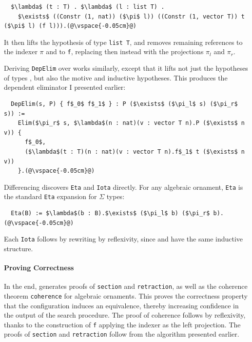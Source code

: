 \begin{lstlisting}
  $\lambda$ (t : T) . $\lambda$ (l : list T) .
    $\exists$ ((Constr (1, nat)) ($\pi$ l)) ((Constr (1, vector T)) t ($\pi$ l) (f l))).(@\vspace{-0.05cm}@)
\end{lstlisting}
It then lifts the hypothesis of type \lstinline{list T}, and removes remaining references to the indexer $\pi$ and to \lstinline{f},
replacing then instead with the projections $\pi_l$ and $\pi_r$.

Deriving \lstinline{DepElim} over \B works similarly, except that it lifts not just the hypotheses of types \Aa, but 
also the motive and inductive hypotheses.
This produces the dependent eliminator I presented earlier:

\begin{lstlisting}
  DepElim(s, P) { f$_0$ f$_1$ } : P ($\exists$ ($\pi_l$ s) ($\pi_r$ s)) :=
    Elim($\pi_r$ s, $\lambda$(n : nat)(v : vector T n).P ($\exists$ n v)) {
      f$_0$,
      ($\lambda$(t : T)(n : nat)(v : vector T n).f$_1$ t ($\exists$ n v))
    }.(@\vspace{-0.05cm}@) 
\end{lstlisting}

Differencing discovers \lstinline{Eta} and \lstinline{Iota} directly.
For any algebraic ornament, \lstinline{Eta} is the standard \lstinline{Eta} expansion for $\Sigma$ types:

\begin{lstlisting}
  Eta(B) := $\lambda$(b : B).$\exists$ ($\pi_l$ b) ($\pi_r$ b).(@\vspace{-0.05cm}@)
\end{lstlisting}
Each \lstinline{Iota} follows by rewriting by reflexivity, since \Aa and \AI have the same inductive structure.

\paragraph{Proving Correctness}
In the end, \toolnamec generates proofs of \lstinline{section} and \lstinline{retraction},
as well as the coherence theorem \lstinline{coherence} for algebraic ornaments.
This proves the correctness property that the configuration induces an equivalence, thereby
increasing confidence in the output of the search procedure.
The proof of coherence follows by reflexivity, thanks to the construction of \lstinline{f} 
applying the indexer as the left projection.
The proofs of \lstinline{section} and \lstinline{retraction} follow from the algorithm presented earlier.

